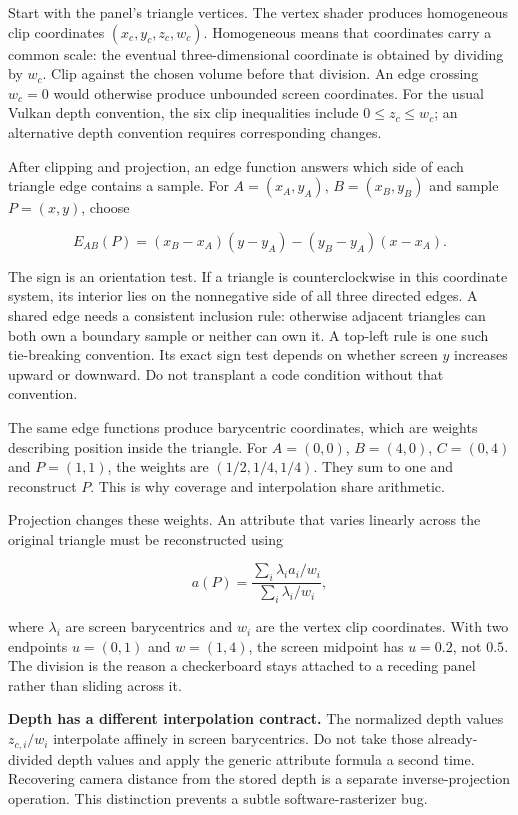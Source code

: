 Start with the panel's triangle vertices. The vertex shader produces homogeneous clip coordinates \((x_c,y_c,z_c,w_c)\). Homogeneous means that coordinates carry a common scale: the eventual three-dimensional coordinate is obtained by dividing by \(w_c\). Clip against the chosen volume before that division. An edge crossing \(w_c=0\) would otherwise produce unbounded screen coordinates. For the usual Vulkan depth convention, the six clip inequalities include \(0\le z_c\le w_c\); an alternative depth convention requires corresponding changes.

After clipping and projection, an edge function answers which side of each triangle edge contains a sample. For \(A=(x_A,y_A)\), \(B=(x_B,y_B)\) and sample \(P=(x,y)\), choose

\[
E_{AB}(P)=(x_B-x_A)(y-y_A)-(y_B-y_A)(x-x_A).
\]

The sign is an orientation test. If a triangle is counterclockwise in this coordinate system, its interior lies on the nonnegative side of all three directed edges. A shared edge needs a consistent inclusion rule: otherwise adjacent triangles can both own a boundary sample or neither can own it. A top-left rule is one such tie-breaking convention. Its exact sign test depends on whether screen \(y\) increases upward or downward. Do not transplant a code condition without that convention.

The same edge functions produce barycentric coordinates, which are weights describing position inside the triangle. For \(A=(0,0)\), \(B=(4,0)\), \(C=(0,4)\) and \(P=(1,1)\), the weights are \((1/2,1/4,1/4)\). They sum to one and reconstruct \(P\). This is why coverage and interpolation share arithmetic.

Projection changes these weights. An attribute that varies linearly across the original triangle must be reconstructed using

\[
a(P)=\frac{\sum_i\lambda_i a_i/w_i}{\sum_i\lambda_i/w_i},
\]

where \(\lambda_i\) are screen barycentrics and \(w_i\) are the vertex clip coordinates. With two endpoints \(u=(0,1)\) and \(w=(1,4)\), the screen midpoint has \(u=0.2\), not \(0.5\). The division is the reason a checkerboard stays attached to a receding panel rather than sliding across it.

\textbf{Depth has a different interpolation contract.} The normalized depth values \(z_{c,i}/w_i\) interpolate affinely in screen barycentrics. Do not take those already-divided depth values and apply the generic attribute formula a second time. Recovering camera distance from the stored depth is a separate inverse-projection operation. This distinction prevents a subtle software-rasterizer bug.

